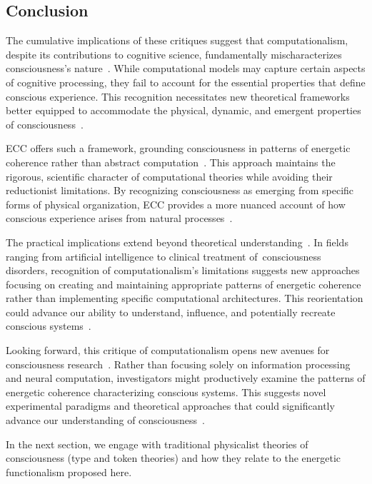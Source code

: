 \subsection*{Conclusion}

The cumulative implications of these critiques suggest that computationalism, despite its contributions to cognitive science, fundamentally mischaracterizes consciousness's nature~\cite{piccinini2013neural,anderson2024physical}. While computational models may capture certain aspects of cognitive processing, they fail to account for the essential properties that define conscious experience. This recognition necessitates new theoretical frameworks better equipped to accommodate the physical, dynamic, and emergent properties of consciousness~\cite{butlin2023consciousnessartificialintelligenceinsights,seth2024conscious}.

ECC offers such a framework, grounding consciousness in patterns of energetic coherence rather than abstract computation~\cite{maturana1980autopoiesis}. This approach maintains the rigorous, scientific character of computational theories while avoiding their reductionist limitations. By recognizing consciousness as emerging from specific forms of physical organization, ECC provides a more nuanced account of how conscious experience arises from natural processes~\cite{searle1980minds}.

The practical implications extend beyond theoretical understanding~\cite{harnad1990symbol}. In fields ranging from artificial intelligence to clinical treatment of~consciousness disorders, recognition of computationalism's limitations suggests new approaches focusing on creating and maintaining appropriate patterns of energetic coherence rather than implementing specific computational architectures. This reorientation could advance our ability to understand, influence, and potentially recreate conscious systems~\cite{bickhard1995foundational}.

Looking forward, this critique of computationalism opens new avenues for consciousness research~\cite{hunt2024electromagnetic,McFadden2020}. Rather than focusing solely on information processing and neural computation, investigators might productively examine the patterns of energetic coherence characterizing conscious systems. This suggests novel experimental paradigms and theoretical approaches that could significantly advance our understanding of consciousness~\cite{van2025processes,amil2024theta}.

In the next section, we engage with traditional physicalist theories of consciousness (type and token theories) and how they relate to the energetic functionalism proposed here.
